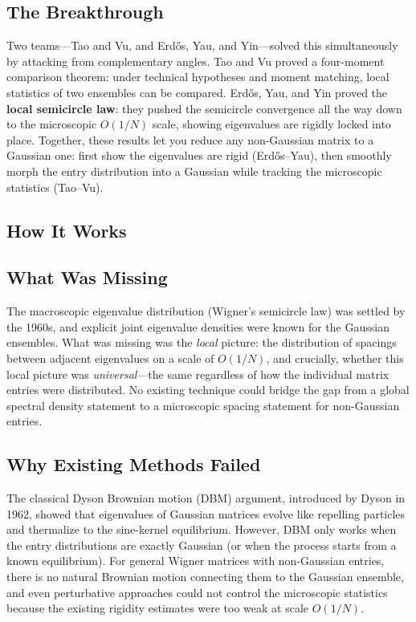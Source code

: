 \subsection{The Breakthrough}
Two teams---Tao and Vu, and Erd\H{o}s, Yau, and Yin---solved this simultaneously by attacking from complementary angles. Tao and Vu proved a four-moment comparison theorem: under technical hypotheses and moment matching, local statistics of two ensembles can be compared. Erd\H{o}s, Yau, and Yin proved the \textbf{local semicircle law}: they pushed the semicircle convergence all the way down to the microscopic $O(1/N)$ scale, showing eigenvalues are rigidly locked into place. Together, these results let you reduce any non-Gaussian matrix to a Gaussian one: first show the eigenvalues are rigid (Erd\H{o}s--Yau), then smoothly morph the entry distribution into a Gaussian while tracking the microscopic statistics (Tao--Vu).

\subsection{How It Works}

\subsection{What Was Missing}
The macroscopic eigenvalue distribution (Wigner's semicircle law) was settled by the 1960s, and explicit joint eigenvalue densities were known for the Gaussian ensembles. What was missing was the \emph{local} picture: the distribution of spacings between adjacent eigenvalues on a scale of $O(1/N)$, and crucially, whether this local picture was \emph{universal}---the same regardless of how the individual matrix entries were distributed. No existing technique could bridge the gap from a global spectral density statement to a microscopic spacing statement for non-Gaussian entries.

\subsection{Why Existing Methods Failed}
The classical Dyson Brownian motion (DBM) argument, introduced by Dyson in 1962, showed that eigenvalues of Gaussian matrices evolve like repelling particles and thermalize to the sine-kernel equilibrium. However, DBM only works when the entry distributions are exactly Gaussian (or when the process starts from a known equilibrium). For general Wigner matrices with non-Gaussian entries, there is no natural Brownian motion connecting them to the Gaussian ensemble, and even perturbative approaches could not control the microscopic statistics because the existing rigidity estimates were too weak at scale $O(1/N)$.

